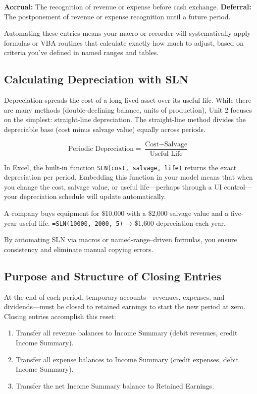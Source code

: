 \begin{Definition}
\textbf{Accrual:} The recognition of revenue or expense before cash exchange.  
\textbf{Deferral:} The postponement of revenue or expense recognition until a future period.
\end{Definition}

Automating these entries means your macro or recorder will systematically apply formulas or VBA routines that calculate exactly how much to adjust, based on criteria you’ve defined in named ranges and tables.

\subsection{Calculating Depreciation with SLN}
Depreciation spreads the cost of a long-lived asset over its useful life. While there are many methods (double-declining balance, units of production), Unit 2 focuses on the simplest: straight-line depreciation. The straight-line method divides the depreciable base (cost minus salvage value) equally across periods.

\[
\text{Periodic Depreciation} = \frac{\text{Cost} - \text{Salvage}}{\text{Useful Life}}
\]

In Excel, the built-in function \verb|SLN(cost, salvage, life)| returns the exact depreciation per period. Embedding this function in your model means that when you change the cost, salvage value, or useful life—perhaps through a UI control—your depreciation schedule will update automatically.

\begin{Example}
A company buys equipment for \$10,000 with a \$2,000 salvage value and a five-year useful life.  
\verb|=SLN(10000, 2000, 5)| → \$1,600 depreciation each year.
\end{Example}

By automating SLN via macros or named‐range–driven formulas, you ensure consistency and eliminate manual copying errors.

\subsection{Purpose and Structure of Closing Entries}
At the end of each period, temporary accounts—revenues, expenses, and dividends—must be closed to retained earnings to start the new period at zero. Closing entries accomplish this reset:

\begin{enumerate}
  \item Transfer all revenue balances to Income Summary (debit revenues, credit Income Summary).
  \item Transfer all expense balances to Income Summary (credit expenses, debit Income Summary).
  \item Transfer the net Income Summary balance to Retained Earnings.
\end{enumerate}

